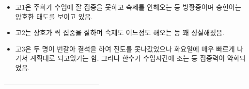 \documentclass[idxtotoc,hyperref,openany]{labbook} %
\begin{document}
\begin{itemize}
	\item 고1은 주희가 수업에 잘 집중을 못하고 숙제를 안해오는 등 방황중이며 승현이는 양호한 태도를 보이고 있음.
	\item 고2는 상호가 썩 집중을 잘하며 숙제도 어느정도 해오는 등 꽤 성실해졌음.
	\item 고3은 두 명이 번갈아 결석을 하여 진도를 못나갔었으나 화요일에 매우 빠르게 나가서 계획대로 되고있기는 함. 그러나 한수가 수업시간에 조는 등
	집중력이 약화되었음.
\end{itemize}





------------------------------------------










\end{document}
